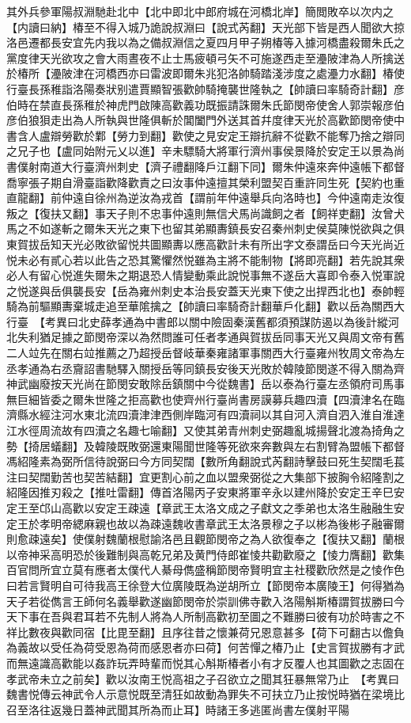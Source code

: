 其外兵參軍陽叔淵馳赴北中【北中即北中郎府城在河橋北岸】簡閲敗卒以次内之【内讀曰納】椿至不得入城乃詭說叔淵曰【說式芮翻】天光部下皆是西人聞欲大掠洛邑遷都長安宜先内我以為之備叔淵信之夏四月甲子朔椿等入據河橋盡殺爾朱氏之黨度律天光欲攻之會大雨晝夜不止士馬疲頓弓矢不可施遂西走至灅陂津為人所擒送於椿所【灅陂津在河橋西亦曰雷波即爾朱兆犯洛帥騎踏淺涉度之處灅力水翻】椿使行臺長孫稚詣洛陽奏狀别遣賈顯智張歡帥騎掩襲世隆執之【帥讀曰率騎奇計翻】彦伯時在禁直長孫稚於神虎門啟陳高歡義功既振請誅爾朱氏節閔帝使舍人郭崇報彦伯彦伯狼狽走出為人所執與世隆俱斬於閶闔門外送其首幷度律天光於高歡節閔帝使中書含人盧辯勞歡於鄴【勞力到翻】歡使之見安定王辯抗辭不從歡不能奪乃捨之辯同之兄子也【盧同始附元乂以進】辛未驃騎大將軍行濟州事侯景降於安定王以景為尚書僕射南道大行臺濟州刺史【濟子禮翻降戶江翻下同】爾朱仲遠來奔仲遠帳下都督喬寧張子期自滑臺詣歡降歡責之曰汝事仲遠擅其榮利盟契百重許同生死【契約也重直龍翻】前仲遠自徐州為逆汝為戎首【謂前年仲遠舉兵向洛時也】今仲遠南走汝復叛之【復扶又翻】事天子則不忠事仲遠則無信犬馬尚識飼之者【飼祥吏翻】汝曾犬馬之不如遂斬之爾朱天光之東下也留其弟顯夀鎮長安召秦州刺史侯莫陳悦欲與之俱東賀拔岳知天光必敗欲留悦共圖顯夀以應高歡計未有所出字文泰謂岳曰今天光尚近悦未必有貳心若以此告之恐其驚懼然悦雖為主將不能制物【將即亮翻】若先說其衆必人有留心悦進失爾朱之期退恐人情變動乘此說悦事無不遂岳大喜即令泰入悦軍說之悦遂與岳俱襲長安【岳為雍州刺史本治長安蓋天光東下使之出捍西北也】泰帥輕騎為前驅顯夀棄城走追至華隂擒之【帥讀曰率騎奇計翻華戶化翻】歡以岳為關西大行臺　【考異曰北史薛孝通為中書郎以關中險固秦漢舊都須預謀防遏以為後計縱河北失利猶足據之節閔帝深以為然問誰可任者孝通與賀拔岳同事天光又與周文帝有舊二人竝先在關右竝推薦之乃超授岳督岐華秦雍諸軍事關西大行臺雍州牧周文帝為左丞孝通為右丞齎詔書馳驛入關授岳等同鎮長安後天光敗於韓陵節閔遂不得入關為齊神武幽廢按天光尚在節閔安敢除岳鎮關中今從魏書】岳以泰為行臺左丞領府司馬事無巨細皆委之爾朱世隆之拒高歡也使齊州行臺尚書房謨募兵趣四瀆【四瀆津名在臨濟縣水經注河水東北流四瀆津津西側岸臨河有四瀆祠以其自河入濟自泗入淮自淮達江水徑周流故有四瀆之名趣七喻翻】又使其弟青州刺史弼趣亂城揚聲北渡為掎角之勢【掎居蟻翻】及韓陵既敗弼還東陽聞世隆等死欲來奔數與左右割臂為盟帳下都督馮紹隆素為弼所信待說弼曰今方同契闊【數所角翻說式芮翻詩擊鼓曰死生契闊毛萇注曰契闊勤苦也契苦結翻】宜更割心前之血以盟衆弼從之大集部下披胸令紹隆割之紹隆因推刃殺之【推吐雷翻】傳首洛陽丙子安東將軍辛永以建州降於安定王辛巳安定王至邙山高歡以安定王疎遠【章武王太洛文成之子獻文之季弟也太洛生融融生安定王於孝明帝緦麻親也故以為疎遠魏收書章武王太洛景穆之子以彬為後彬子融審爾則愈疎遠矣】使僕射魏蘭根慰諭洛邑且觀節閔帝之為人欲復奉之【復扶又翻】蘭根以帝神采高明恐於後難制與高乾兄弟及黄門侍郎崔㥄共勸歡廢之【㥄力膺翻】歡集百官問所宜立莫有應者太僕代人綦母儁盛稱節閔帝賢明宜主社稷歡欣然是之㥄作色曰若言賢明自可待我高王徐登大位廣陵既為逆胡所立【節閔帝本廣陵王】何得猶為天子若從儁言王師何名義舉歡遂幽節閔帝於崇訓佛寺歡入洛陽斛斯椿謂賀拔勝曰今天下事在吾與君耳若不先制人將為人所制高歡初至圖之不難勝曰彼有功於時害之不祥比數夜與歡同宿【比毘至翻】且序往昔之懷兼荷兄恩意甚多【荷下可翻古以儋負為義故以受任為荷受恩為荷而感恩者亦曰荷】何苦憚之椿乃止【史言賀拔勝有才武而無遠識高歡能以姦詐玩弄時輩而悦其心斛斯椿者小有才反覆人也其圖歡之志固在孝武帝未立之前矣】歡以汝南王悦高祖之子召欲立之聞其狂暴無常乃止　【考異曰魏書悦傳云神武令人示意悦既至清狂如故動為罪失不可扶立乃止按悦時猶在梁境比召至洛往返幾日蓋神武聞其所為而止耳】時諸王多逃匿尚書左僕射平陽